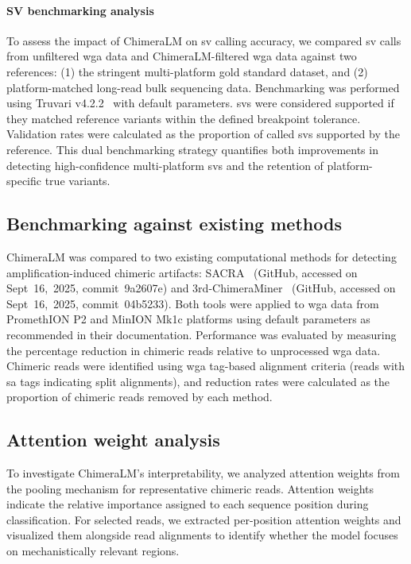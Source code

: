\documentclass[pdflatex,sn-nature,lineno]{sn-jnl}%
\theoremstyle{thmstyleone}%
\theoremstyle{thmstyletwo}%
\theoremstyle{thmstylethree}%
\begin{document}
\paragraph{SV benchmarking analysis}
To assess the impact of ChimeraLM on \gls{sv} calling accuracy, we compared \gls{sv} calls from unfiltered \gls{wga} data and ChimeraLM-filtered \gls{wga} data against two references: (1) the stringent multi-platform gold standard dataset, and (2) platform-matched long-read bulk sequencing data.
Benchmarking was performed using Truvari v4.2.2~\cite{english2022truvari} with default parameters.
\glspl{sv} were considered supported if they matched reference variants within the defined breakpoint tolerance.
Validation rates were calculated as the proportion of called \glspl{sv} supported by the reference.
This dual benchmarking strategy quantifies both improvements in detecting high-confidence multi-platform \glspl{sv} and the retention of platform-specific true variants.

\subsection*{Benchmarking against existing methods}
ChimeraLM was compared to two existing computational methods for detecting amplification-induced chimeric artifacts: SACRA~\cite{kiguchi2021longread} (GitHub, accessed on Sept~16,~2025, commit~9a2607e) and 3rd-ChimeraMiner~\cite{lu2023exploration} (GitHub, accessed on Sept~16,~2025, commit~04b5233).
Both tools were applied to \gls{wga} data from PromethION P2 and MinION Mk1c platforms using default parameters as recommended in their documentation.
Performance was evaluated by measuring the percentage reduction in chimeric reads relative to unprocessed \gls{wga} data.
Chimeric reads were identified using \gls{wga} tag-based alignment criteria (reads with \gls{sa} tags indicating split alignments), and reduction rates were calculated as the proportion of chimeric reads removed by each method.


\subsection*{Attention weight analysis}

To investigate ChimeraLM's interpretability, we analyzed attention weights from the pooling mechanism for representative chimeric reads.
Attention weights indicate the relative importance assigned to each sequence position during classification.
For selected reads, we extracted per-position attention weights and visualized them alongside read alignments to identify whether the model focuses on mechanistically relevant regions.
\end{document}
